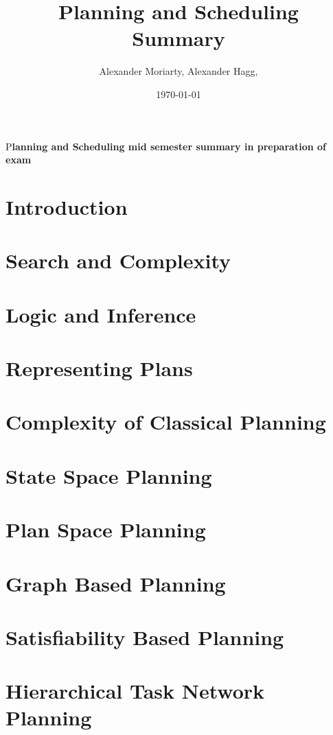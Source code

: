 \documentclass[	DIV=calc,%
							paper=a4,%
							fontsize=11pt]{scrartcl}	 					%
\title{Planning and Scheduling\\ Summary}	%
\author{Alexander Moriarty, Alexander Hagg, }									%
\date{\today}							%
\newcommand{\initial}[1]{%
     \lettrine[lines=3,lhang=0.3,nindent=0em]{
     				\color{brsublue}
     				{\textsf{#1}}}{}}
\begin{document}
\maketitle
\thispagestyle{fancy} 			%
\initial{P}\textbf{lanning and Scheduling mid semester summary in preparation of exam}

\section{Introduction}


\section{Search and Complexity}


\section{Logic and Inference}


\section{Representing Plans}


\section{Complexity of Classical Planning}


\section{State Space Planning}


\section{Plan Space Planning}


\section{Graph Based Planning}


\section{Satisfiability Based Planning}


\section{Hierarchical Task Network Planning}

\end{document}
